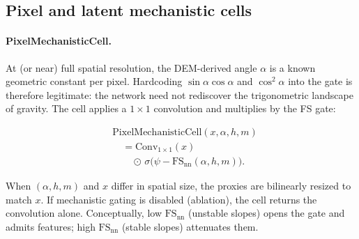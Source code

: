 \subsection{Pixel and latent mechanistic cells}
\label{sec:cells}
\paragraph{PixelMechanisticCell.}
At (or near) full spatial resolution, the DEM-derived angle \(\alpha\) is a known geometric constant per pixel. Hardcoding \(\sin\alpha\cos\alpha\) and \(\cos^{2}\alpha\) into the gate is therefore legitimate: the network need not rediscover the trigonometric landscape of gravity. The cell applies a \(1\times1\) convolution and multiplies by the FS gate:
\begin{definition}[PixelMechanisticCell]
\label{def:pixel}
\begin{equation}
\label{eq:pixel}
\begin{split}
&\mathrm{PixelMechanisticCell}(x,\alpha,h,m)\\
&\quad=
\mathrm{Conv}_{1\times1}(x)\\
&\qquad{}\odot\,
\sigma\bigl(\psi-\mathrm{FS}_{\mathrm{nn}}(\alpha,h,m)\bigr).
\end{split}
\end{equation}
\end{definition}
When \((\alpha,h,m)\) and \(x\) differ in spatial size, the proxies are bilinearly resized to match \(x\). If mechanistic gating is disabled (ablation), the cell returns the convolution alone. Conceptually, low \(\mathrm{FS}_{\mathrm{nn}}\) (unstable slopes) opens the gate and admits features; high \(\mathrm{FS}_{\mathrm{nn}}\) (stable slopes) attenuates them.

